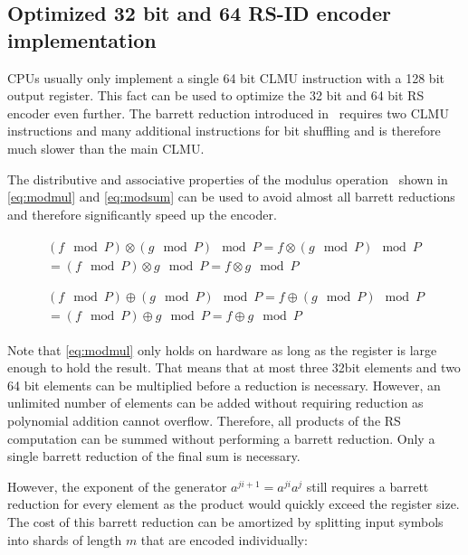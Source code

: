 \documentclass[
]{article}
\begin{document}
\subsection{Optimized 32 bit and 64 RS-ID encoder
implementation}\label{optimized-32-bit-rs-id-encoder-implementation}

CPUs usually only implement a single 64 bit CLMU instruction with a 128
bit output register. This fact can be used to optimize the 32 bit and 64 bit RS
encoder even further. The barrett reduction introduced in~\cite{Dixon2009}
requires two CLMU instructions and many additional instructions for bit
shuffling and is therefore much slower than the main CLMU.

The distributive and associative properties of the modulus
operation~\cite{Dixon2009} shown in \eqref{eq:modmul} and \eqref{eq:modsum} can be used to avoid almost all barrett reductions and therefore significantly speed up the encoder.
  
\begin{gather}
\begin{gathered}
(f \mod P) \otimes (g \mod P) \mod P = f \otimes (g \mod P) \mod P\\
= (f \mod P) \otimes g \mod P = f \otimes g \mod P\\
\end{gathered}\label{eq:modmul}\\
\begin{gathered}
(f \mod P) \oplus (g  \mod P) \mod P = f \oplus (g \mod P) \mod P\\
 = (f \mod P) \oplus g \mod P = f \oplus g \mod P\label{eq:modsum}
\end{gathered}
\end{gather}

Note that \eqref{eq:modmul} only holds on hardware as long as the register is large enough
to hold the result. That means that at most three 32bit elements and two 64 bit elements can be
multiplied before a reduction is necessary. However, an unlimited number
of elements can be added without requiring reduction as polynomial addition cannot overflow. Therefore, all products of the RS computation can be summed without performing a barrett
reduction. Only a single barrett reduction of the final sum is necessary.

However, the exponent of the generator \(a^{ji + 1} = a^{ji} a^j\) still
requires a barrett reduction for every element as the product would
quickly exceed the register size. The cost of this barrett reduction can
be amortized by splitting input symbols into shards of
length \(m\) that are encoded individually:
\end{document}
